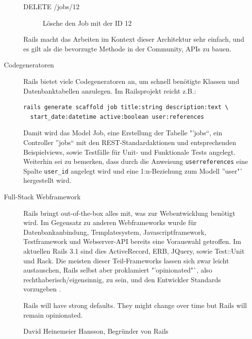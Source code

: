 \begin{description}
\begin{description}
  \item[DELETE /jobs/12] Lösche den Job mit der ID 12
  \end{description} 
 Rails macht das Arbeiten im Kontext dieser Architektur sehr einfach, und es gilt als die bevorzugte Methode in der Community, APIs zu bauen. 
 \item[Codegeneratoren] Rails bietet viele Codegeneratoren an, um schnell benötigte Klassen und Datenbanktabellen anzulegen. Im Railsprojekt reicht z.B.:
\begin{lstlisting}
rails generate scaffold job title:string description:text \
  start_date:datetime active:boolean user:references
\end{lstlisting}
  Damit wird das Model Job, eine Erstellung der Tabelle "'jobs"`, ein Controller "'jobs"` mit den REST-Standardaktionen und entsprechenden Beispielviews, sowie Testfälle für Unit- und Funktionale Tests angelegt. Weiterhin sei zu bemerken, dass durch die Anweisung \texttt{user\:references} eine Spalte \texttt{user\_id} angelegt wird und eine 1:n-Beziehung zum Modell "'user"` hergestellt wird.
 \item[Full-Stack Webframework] Rails bringt out-of-the-box alles mit, was zur Webentwicklung benötigt wird. Im Gegensatz zu anderen Webframeworks wurde für Datenbankanbindung, Templatesystem, Javascriptframework, Testframework und Webserver-API bereits eine Vorauswahl getroffen. Im aktuellen Rails 3.1 sind dies ActiveRecord, ERB, JQuery, sowie Test::Unit und Rack. Die meisten dieser Teil-Frameworks lassen sich zwar leicht austauschen, Rails selbst aber proklamiert "'opinionated"`, also rechthaberisch/eigensinnig, zu sein, und den Entwickler Standards vorzugeben \citep{david_heinemeier_hansson_railsconf_2011}.
 \epigraph{Rails will have strong defaults. They might change over time but Rails will remain opinionated.}{David Heinemeier Hansson, Begründer von Rails}
\end{description}

